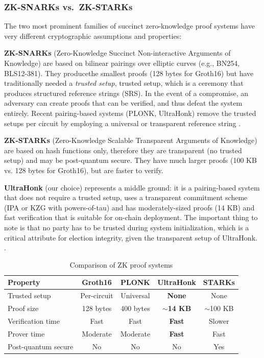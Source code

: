\documentclass[12pt, a4paper]{report}
\begin{document}
\subsubsection{ZK-SNARKs vs.\ ZK-STARKs}

The two most prominent families of succinct zero-knowledge proof systems have very different cryptographic assumptions and properties:

\textbf{ZK-SNARKs} (Zero-Knowledge Succinct Non-interactive Arguments of Knowledge) \cite{groth2016size} are based on bilinear pairings over elliptic curves (e.g., BN254, BLS12-381). They producethe smallest proofs (128 bytes for Groth16) but have traditionally needed a \textit{trusted setup}, trusted setup, which is a ceremony that produces structured reference strings (SRS). In the event of a compromise, an adversary can create proofs that can be verified, and thus defeat the system entirely. Recent pairing-based systems (PLONK, UltraHonk) remove the trusted setups per circuit by employing a universal or transparent reference string \cite{gabizon2019plonk}.

\textbf{ZK-STARKs} (Zero-Knowledge Scalable Transparent Arguments of Knowledge) are based on hash functions only, therefore they are transparent (no trusted setup) and may be post-quantum secure. They have much larger proofs (100 KB vs. 128 bytes for Groth16), but are faster to verify.

\textbf{UltraHonk} (our choice) represents a middle ground: it is a pairing-based system that does not require a trusted setup, uses a transparent commitment scheme (IPA or KZG with powers-of-tau) and has moderately-sized proofs (14 KB) and fast verification that is suitable for on-chain deployment. The important thing to note is that no party has to be trusted during system initialization, which is a critical attribute for election integrity, given the transparent setup of UltraHonk. \cite{aztec2024ultrahonk}.

\begin{table}[H]
\centering
\caption{Comparison of ZK proof systems}
\label{tab:zk_systems}
\begin{tabular}{|l|c|c|c|c|}
\hline
\textbf{Property} & \textbf{Groth16} & \textbf{PLONK} & \textbf{UltraHonk} & \textbf{STARKs} \\ \hline
Trusted setup & Per-circuit & Universal & \textbf{None} & None \\ \hline
Proof size & 128 bytes & 400 bytes & \textbf{$\sim$14 KB} & $\sim$100 KB \\ \hline
Verification time & Fast & Fast & \textbf{Fast} & Slower \\ \hline
Prover time & Moderate & Moderate & \textbf{Fast} & Fast \\ \hline
Post-quantum secure & No & No & No & Yes \\ \hline
\end{tabular}
\end{table}
\end{document}

